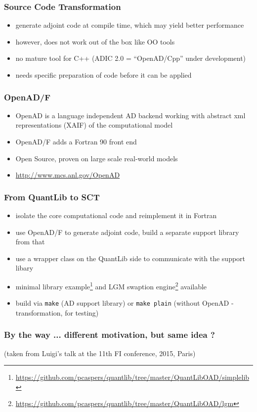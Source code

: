 \documentclass[10pt,German]{beamer}
\begin{document}
\begin{frame}[fragile]
\frametitle{Source Code Transformation}
\begin{itemize}
\item generate adjoint code at compile time, which may yield better performance
\item however, does not work out of the box like OO tools
\item no mature tool for C++ (ADIC 2.0 = ``OpenAD/Cpp'' under development)
\item needs specific preparation of code before it can be applied
\end{itemize}
\end{frame}

\begin{frame}[fragile]
\frametitle{OpenAD/F}
\begin{itemize}
\item OpenAD is a language independent AD backend working with abstract xml representations (XAIF) of the computational model
\item OpenAD/F adds a Fortran 90 front end
\item Open Source, proven on large scale real-world models
\item \url{http://www.mcs.anl.gov/OpenAD}
\end{itemize}
\end{frame}

\begin{frame}[fragile]
\frametitle{From QuantLib to SCT}
\begin{itemize}
\item isolate the core computational code and reimplement it in Fortran
\item use OpenAD/F to generate adjoint code, build a separate support library from that
\item use a wrapper class on the QuantLib side to communicate with the support libary
\item minimal library example\footnote{\tiny\url{https://github.com/pcaspers/quantlib/tree/master/QuantLibOAD/simplelib}} and LGM swaption engine\footnote{\tiny\url{https://github.com/pcaspers/quantlib/tree/master/QuantLibOAD/lgm}} available
\item build via \verb+make+ (AD support library) or \verb+make plain+ (without OpenAD - transformation, for testing)
\end{itemize}
\end{frame}

\begin{frame}[fragile]
\frametitle{By the way ... different motivation, but same idea ?}
(taken from Luigi's talk at the 11th FI conference, 2015, Paris)
\end{frame}
\end{document}
